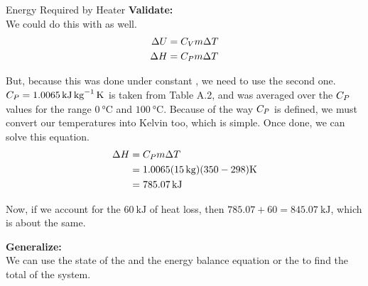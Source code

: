 \begin{example}{Energy Required by Heater}
  \textbf{Validate:} \\
  We could do this with  as well.
  \begin{align*}
    \Delta U &= C_{V} m \Delta T \\
    \Delta H &= C_{P} m \Delta T
  \end{align*}

  But, because this  was done under constant , we need to use the second one.
  $C_{P} = \SI{1.0065}{\kilo\joule\per\kilo\gram\kelvin}$ is taken from Table A.2, and was averaged over the $C_{P}$ values for the range $\SI{0}{\degreeCelsius}$ and $\SI{100}{\degreeCelsius}$.
  Because of the way $C_{P}$ is defined, we must convert our temperatures into Kelvin too, which is simple.
  Once done, we can solve this equation.
  \begin{align*}
    \Delta H &= C_{P} m \Delta T \\
                       &= 1.0065 (\SI{15}{\kilo\gram}) (350 - 298) \si{\kelvin} \\
                       &= \SI{785.07}{\kilo\joule}
  \end{align*}

  Now, if we account for the $\SI{60}{\kilo\joule}$ of heat loss, then $785.07 + 60 = \SI{845.07}{\kilo\joule}$, which is about the same.

  \textbf{Generalize:} \\
  We can use the state of the  and the energy balance equation or the  to find the total  of the system.
\end{example}

